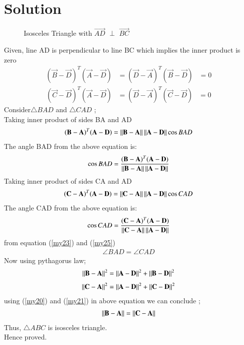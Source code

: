 \documentclass[journal,12pt,twocolumn]{IEEEtran}
\begin{document}
\section{Solution}
\renewcommand{\thefigure}{1}
\begin{figure}[!ht]
\centering
\resizebox{\columnwidth}{!}{}
\caption{Isosceles Triangle with $\vec{AD}$  $\perp$ $\vec{BC}$}
\label{fig:tri_right_angle}
\end{figure}
Given,
line AD is perpendicular to line BC which implies the inner product is zero  	
\begin{align}\label{my20}	
(\vec{B}-\vec{D})^T (\vec{A}-\vec{D}) &= (\vec{D}-\vec{A
})^T (\vec{B}-\vec{D})&= 0
\end{align}
\begin{align}\label{my21}
(\vec{C}-\vec{D})^T (\vec{A}-\vec{D}) &= (\vec{D}-\vec{A})^T (\vec{C}-\vec{D})&= 0	
\end{align}
Consider$\triangle{BAD}$ and $\triangle{CAD}$ ;\\	
Taking inner product of sides BA and AD	
\begin{align}\label{my22}	
(\mathbf{B}-\mathbf{A})^T(\mathbf{A}-\mathbf{D}) =	
\left\lVert\mathbf{B}-\mathbf{A}\right\rVert\left\lVert\mathbf{A}-\mathbf{D}\right\rVert\cos{BAD}	
\end{align}
The angle BAD from the  above equation is:	
\begin{align}\label{my23}	
     \cos{BAD} = \frac{(\mathbf{B}-\mathbf{A})^T(\mathbf{A}-\mathbf{D})}{\left\lVert\mathbf{B}-\mathbf{A}\right\rVert\left\lVert\mathbf{A}-\mathbf{D}\right\rVert} 
\end{align}
Taking inner product of sides CA and AD	
\begin{align}\label{my24}	
(\mathbf{C}-\mathbf{A})^T(\mathbf{A}-\mathbf{D}) =	
\left\lVert\mathbf{C}-\mathbf{A}\right\rVert\left\lVert\mathbf{A}-\mathbf{D}\right\rVert\cos{CAD}	
\end{align}
The angle CAD from the  above equation is:	
\begin{align}\label{my25}	
     \cos{CAD} = \frac{(\mathbf{C}-\mathbf{A})^T(\mathbf{A}-\mathbf{D})}{\left\lVert\mathbf{C}-\mathbf{A}\right\rVert\left\lVert\mathbf{A}-\mathbf{D}\right\rVert} 
\end{align}
from equation (\ref{my23}) and (\ref{my25})\\	
\begin{align}
\angle {BAD}=\angle {CAD}	
\end{align}
Now using pythagorus law;
\begin{align}\label{my26}
     \left\lVert\mathbf{B-A}\right\rVert^2 = \left\lVert\mathbf{A-D}\right\rVert^2+ \left\lVert\mathbf{B-D}\right\rVert^2
\end{align}
\begin{align}\label{my27}
     \left\lVert\mathbf{C-A}\right\rVert^2 = \left\lVert\mathbf{A-D}\right\rVert^2+ \left\lVert\mathbf{C-D}\right\rVert^2
\end{align}
using (\ref{my20}) and (\ref{my21}) in above equation we can conclude ;
\begin{align}\label{my28}
     \left\lVert\mathbf{B-A}\right\rVert = \left\lVert\mathbf{C-A}\right\rVert 
\end{align}
Thus, $\triangle{ABC}$ is isosceles triangle. \\
Hence proved.
\end{document}
